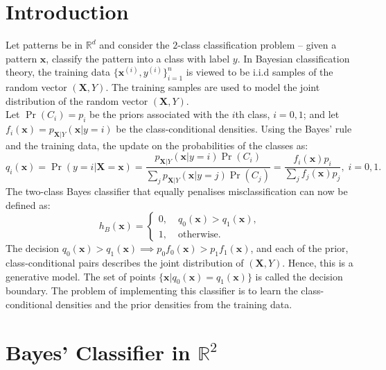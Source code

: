 \documentclass[12pt, a4 paper]{article}
\newcommand{\bx}{\mathbf{x}}
\newcommand{\bX}{\mathbf{X}}
\newcommand{\rr}{\mathbb{R}}
\begin{document}




\section*{Introduction}
\label{sec:intro}

Let patterns be in $\rr^d$ and consider the $2$-class classification problem -- given a pattern $\bx$, classify the pattern into a class with label $y$. In Bayesian classification theory, the training data $\{\bx^{(i)}, y^{(i)}\}_{i=1}^n$ is viewed to be i.i.d samples of the random vector $(\bX, Y)$. The training samples are used to model the joint distribution of the random vector $(\bX, Y)$. \\

Let $\Pr(C_i) = p_i$ be the priors associated with the $i$th class, $i=0,1$; and let $f_i(\bx) = p_{\bX\vert Y}(\bx \vert y=i)$ be the class-conditional densities. Using the Bayes' rule and the training data, the update on the probabilities of the classes as:
\begin{equation}
	q_i(\bx) = \Pr(y=i\vert \bX=\bx) = \frac{p_{\bX\vert Y}(\bx \vert y=i)\Pr(C_i)}{\sum_j p_{\bX\vert Y}(\bx \vert y=j)\Pr(C_j)} = \frac{f_i(\bx) p_i}{\sum_j f_j(\bx) p_j}, \; i=0,1.
\end{equation}
The two-class Bayes classifier that equally penalises misclassification can now be defined as:
\begin{equation}
	h_B(\bx) = \begin{cases}
		0, &\; q_{0}(\bx) > q_1(\bx), \\
		1, &\; \mathrm{otherwise}.
	\end{cases}
\label{eq:bayesClassifier}
\end{equation}
The decision $q_0(\bx) > q_1(\bx) \implies p_0 f_0(\bx) > p_1 f_1(\bx)$, and each of the prior, class-conditional pairs describes the joint distribution of $(\bX, Y)$. Hence, this is a generative model. The set of points $\{\bx \vert q_0(\bx) = q_1(\bx)\}$ is called the decision boundary. The problem of implementing this classifier is to learn the class-conditional densities and the prior densities from the training data.


\section{Bayes' Classifier in $\rr^{2}$}
\label{sec:bayes2D}
\end{document}
